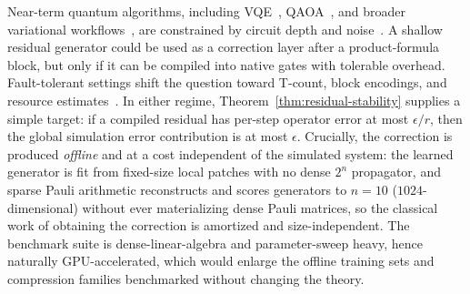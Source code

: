 \documentclass[aps,prxquantum,reprint,superscriptaddress,nofootinbib,amsmath,amssymb]{revtex4-2}
\begin{document}
Near-term quantum algorithms, including VQE~\cite{peruzzo2014,mcclean2016}, QAOA~\cite{farhi2014,huynh2026gctr}, and broader variational workflows~\cite{cerezo2021,bharti2022,endo2021}, are constrained by circuit depth and noise~\cite{preskill2018,kandala2017,kim2023}. A shallow residual generator could be used as a correction layer after a product-formula block, but only if it can be compiled into native gates with tolerable overhead. Fault-tolerant settings shift the question toward T-count, block encodings, and resource estimates~\cite{wecker2014,wecker2015,babbush2018,babbush2019,haah2021}. In either regime, Theorem~\ref{thm:residual-stability} supplies a simple target: if a compiled residual has per-step operator error at most $\epsilon/r$, then the global simulation error contribution is at most $\epsilon$. Crucially, the correction is produced \emph{offline} and at a cost independent of the simulated system: the learned generator is fit from fixed-size local patches with no dense $2^n$ propagator, and sparse Pauli arithmetic reconstructs and scores generators to $n=10$ ($1024$-dimensional) without ever materializing dense Pauli matrices, so the classical work of obtaining the correction is amortized and size-independent. The benchmark suite is dense-linear-algebra and parameter-sweep heavy, hence naturally GPU-accelerated, which would enlarge the offline training sets and compression families benchmarked without changing the theory.
\end{document}
